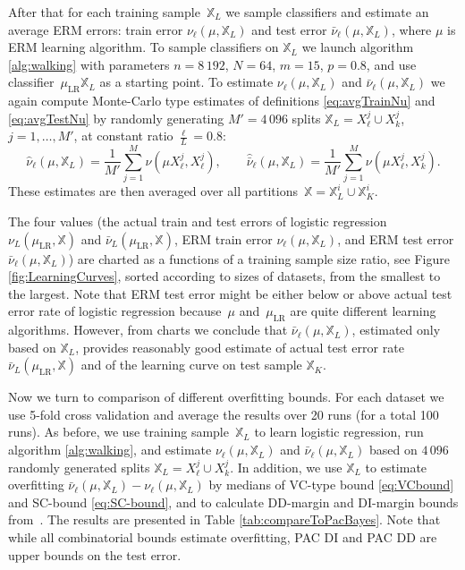\documentclass{article} %
\def\XX{\mathbb{X}}
\def\LR{\text{LR}}
\begin{document}
After that for each training sample~$\XX_L$ we sample classifiers
and estimate an average ERM errors:
train error $\nu_\ell(\mu, \XX_L)$
and test error $\bar \nu_\ell(\mu, \XX_L)$,
where $\mu$ is ERM learning algorithm.
To sample classifiers on $\XX_L$ we launch algorithm \ref{alg:walking}
with parameters $n=8\,192$, $N = 64$, $m = 15$, $p = 0.8$,
and use classifier~$\mu_\LR \XX_L$ as a starting point.
To estimate $\nu_\ell(\mu, \XX_L)$ and $\bar \nu_\ell(\mu, \XX_L)$ we again compute Monte-Carlo type
estimates of definitions \eqref{eq:avgTrainNu} and \eqref{eq:avgTestNu}
by randomly generating $M' = 4\,096$ splits $\XX_L = X_\ell^j \cup X_k^j$,
$j = 1, \dots, M'$, at constant ratio $\frac{\ell}{L} = 0.8$:
\[
    \hat \nu_\ell(\mu, \XX_L)
    =
    \frac{1}{M'} \sum_{j = 1}^{M} \nu(\mu X_\ell^j, X_\ell^j),
    \qquad
    \hat{\bar \nu}_\ell(\mu, \XX_L)
    =
    \frac{1}{M'} \sum_{j = 1}^{M} \nu(\mu X_\ell^j, X_k^j).
\]
These estimates are then averaged over all partitions~$\XX = \XX_L^i \cup \XX_K^i$.

The four values (the actual train and test errors of logistic regression
$\nu_L(\mu_\LR, \XX)$ and $\bar \nu_L(\mu_\LR, \XX)$,
ERM train error $\nu_\ell(\mu, \XX_L)$, and ERM test error $\bar \nu_\ell(\mu, \XX_L)$)
are charted as a functions of a training sample size ratio, see Figure \ref{fig:LearningCurves},
sorted according to sizes of datasets, from the smallest to the largest.
Note that ERM test error might be either below or above
actual test error rate of logistic regression
because~$\mu$ and~$\mu_\LR$ are quite different learning algorithms.
However, from charts we conclude that $\bar \nu_\ell(\mu, \XX_L)$,
estimated only based on $\XX_L$, provides reasonably good estimate
of actual test error rate $\bar \nu_L(\mu_\LR, \XX)$
and of the learning curve on test sample $\XX_K$.

Now we turn to comparison of different overfitting bounds.
For each dataset we use 5-fold cross validation and average the results over 20 runs (for a total 100 runs).
As before, we use training sample~$\XX_L$ to learn logistic regression,
run algorithm \ref{alg:walking}, and
estimate $\nu_\ell(\mu, \XX_L)$ and $\bar \nu_\ell(\mu, \XX_L)$
based on $4\,096$ randomly generated splits $\XX_L = X_\ell^j \cup X_k^j$.
In addition, we use $\XX_L$ to estimate overfitting
$\bar \nu_\ell(\mu, \XX_L) - \nu_\ell(\mu, \XX_L)$
by medians of VC-type bound \eqref{eq:VCbound} and SC-bound \eqref{eq:SC-bound},
and to calculate DD-margin and DI-margin bounds from~\cite{jin2012pacbayes}.
The results are presented in Table \ref{tab:compareToPacBayes}.
Note that while all combinatorial bounds estimate overfitting, PAC DI and PAC DD are upper bounds on the test error.
\end{document}

